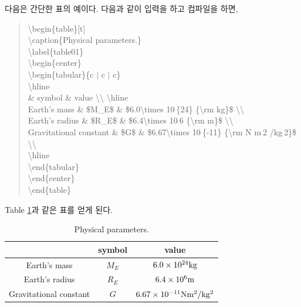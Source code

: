 \documentclass[twoside,11pt]{gshs_thesis}
\begin{document}
다음은 간단한 표의 예이다. 다음과 같이 입력을 하고 컴파일을 하면,
\begin{quote}
{\textbackslash}begin\{table\}[t]\\
{\textbackslash}caption\{Physical parameters.\}\\
{\textbackslash}label\{table01\}\\
{\textbackslash}begin\{center\}\\
{\textbackslash}begin\{tabular\}\{c $|$ c $|$ c\}\\
{\textbackslash}hline\\
 \& symbol \& value {\textbackslash}{\textbackslash} {\textbackslash}hline \\
Earth's mass \& \$M\_E\$ \& \$6.0{\textbackslash}times 10$\hat{\ }$\{24\} \{{\textbackslash}rm kg\}\$ {\textbackslash}{\textbackslash}\\
Earth's radius \& \$R\_E\$ \& \$6.4{\textbackslash}times 10$\hat{\ }$6 \{{\textbackslash}rm m\}\$ {\textbackslash}{\textbackslash}\\
Gravitational constant \& \$G\$ \& \$6.67{\textbackslash}times 10$\hat{\ }$\{-11\} \{{\textbackslash}rm N m$\hat{\ }$2 /kg$\hat{\ }$2\}\$ {\textbackslash}{\textbackslash} \\
{\textbackslash}hline\\
{\textbackslash}end\{tabular\}\\
{\textbackslash}end\{center\}\\
{\textbackslash}end\{table\}
\end{quote}
Table \ref{table01}과 같은 표를 얻게 된다.
\begin{table}[h]
\caption{Physical parameters.} \label{table01}
\begin{center}
\begin{tabular}{c|c|c}
\hline
 & symbol & value \\ \hline
Earth's mass & $M_E$ & $6.0\times 10^{24} {\rm kg}$ \\
Earth's radius & $R_E$ & $6.4\times 10^6 {\rm m}$ \\
Gravitational constant & $G$ & $6.67\times 10^{-11} {\rm N m^2 /kg^2}$ \\ \hline
\end{tabular}
\end{center}
\end{table}


\end{document}
